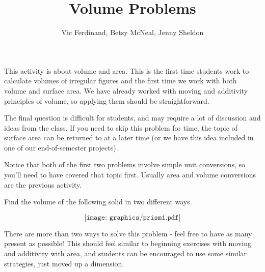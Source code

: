 \documentclass{ximera}
\title{Volume Problems}
\author{Vic Ferdinand, Betsy McNeal, Jenny Sheldon}
\begin{document}
\begin{abstract}
\end{abstract}

\maketitle

\begin{instructorIntro}
This activity is about volume and area.  This is the first time students work to calculate volumes of irregular figures and the first time we work with both volume and surface area.  We have already worked with moving and additivity principles of volume, so applying them should be straightforward.

The final question is difficult for students, and may require a lot of discussion and ideas from the class.  If you need to skip this problem for time, the topic of surface area can be returned to at a later time (or we have this idea included in one of our end-of-semester projects).

Notice that both of the first two problems involve simple unit conversions, so you'll need to have covered that topic first.  Usually area and volume conversions are the previous activity.
\end{instructorIntro}

\begin{problem}
Find the volume of the following solid in two different ways.

\[
\texttt{[image: graphics/prism1.pdf]}
\]

\begin{instructorNotes}
There are more than two ways to solve this problem - feel free to have as many present as possible!  This should feel similar to beginning exercises with moving and additivity with area, and students can be encouraged to use some similar strategies, just moved up a dimension.
\end{instructorNotes}
\end{problem}
\end{document}
